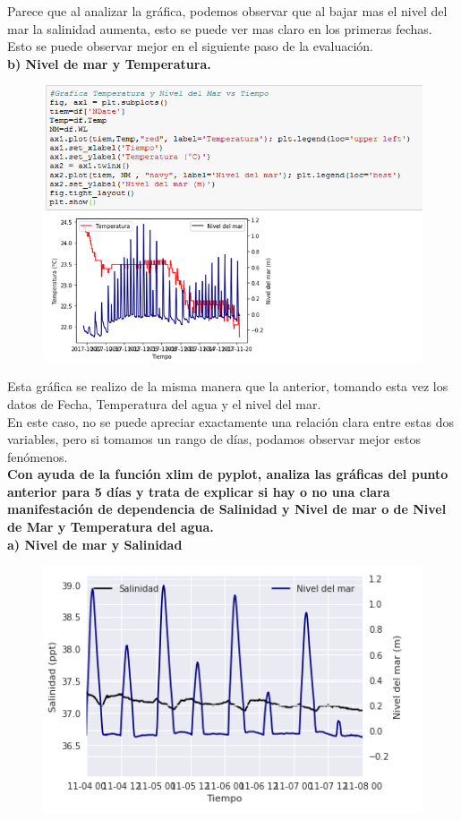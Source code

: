 \documentclass[12pt]{article}
\begin{document}
Parece que al analizar la gráfica, podemos observar que al bajar mas el nivel del mar la salinidad aumenta, esto se puede ver mas claro en los primeras fechas. Esto se puede observar mejor en el siguiente paso de la evaluación. \\

\noindent\textbf {b) Nivel de mar y Temperatura.}
\begin{figure}[h!]
    \centering
\includegraphics[width=6in]{SP2.png}
\end{figure}

Esta gráfica se realizo de la misma manera que la anterior, tomando esta vez los datos de Fecha, Temperatura del agua y el nivel del mar. \\

En este caso, no se puede apreciar exactamente una relación clara entre estas dos variables, pero si tomamos un rango de días, podamos observar mejor estos fenómenos. \\

\noindent\textbf {Con ayuda de la función xlim de pyplot, analiza las gráficas del punto anterior para 5 días y trata de explicar si hay o no una clara manifestación de dependencia de Salinidad y Nivel de mar o de Nivel de Mar y Temperatura del agua. } \\

\noindent\textbf {a) Nivel de mar y Salinidad}
\begin{figure}[h!]
    \centering
\includegraphics[width=5in]{SP1lim.png}
\end{figure}
\end{document}
